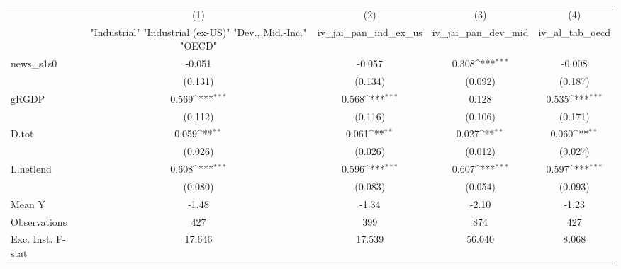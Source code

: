 {
\def\sym#1{\ifmmode^{#1}\else\(^{#1}\)\fi}
\begin{tabular}{l*{4}{c}}
\toprule
            &\multicolumn{1}{c}{(1)}&\multicolumn{1}{c}{(2)}&\multicolumn{1}{c}{(3)}&\multicolumn{1}{c}{(4)}\\
            &\multicolumn{1}{c}{ "Industrial" "Industrial (ex-US)" "Dev., Mid.-Inc." "OECD" }&\multicolumn{1}{c}{iv\_jai\_pan\_ind\_ex\_us}&\multicolumn{1}{c}{iv\_jai\_pan\_dev\_mid}&\multicolumn{1}{c}{iv\_al\_tab\_oecd}\\
\midrule
news\_s1s0   &      -0.051         &      -0.057         &       0.308\sym{***}&      -0.008         \\
            &     (0.131)         &     (0.134)         &     (0.092)         &     (0.187)         \\
\addlinespace
gRGDP       &       0.569\sym{***}&       0.568\sym{***}&       0.128         &       0.535\sym{***}\\
            &     (0.112)         &     (0.116)         &     (0.106)         &     (0.171)         \\
\addlinespace
D.tot       &       0.059\sym{**} &       0.061\sym{**} &       0.027\sym{**} &       0.060\sym{**} \\
            &     (0.026)         &     (0.026)         &     (0.012)         &     (0.027)         \\
\addlinespace
L.netlend   &       0.608\sym{***}&       0.596\sym{***}&       0.607\sym{***}&       0.597\sym{***}\\
            &     (0.080)         &     (0.083)         &     (0.054)         &     (0.093)         \\
\midrule
Mean Y      &       -1.48         &       -1.34         &       -2.10         &       -1.23         \\
Observations&         427         &         399         &         874         &         427         \\
Exc. Inst. F-stat&      17.646         &      17.539         &      56.040         &       8.068         \\
\bottomrule
\end{tabular}
}
